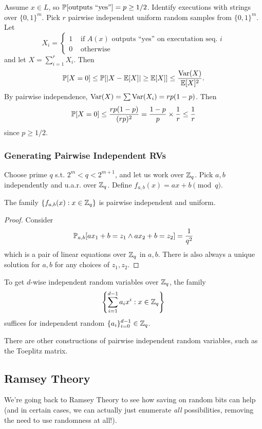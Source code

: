 \documentclass[11 pt]{scrartcl}
\begin{document}
    Assume $x\in L$, so $\mathbb P[\text{outputs ``yes''}] = p \geq 1/2$. Identify executions with strings over $\{0,1\}^m$. Pick $r$ pairwise independent uniform random samples from $\{0,1\}^m$. Let 
    \[ X_i = \begin{cases} 1 &\text{ if } A(x) \text{ outputs ``yes'' on executation seq. }i \\ 0 &\text{ otherwise} \end{cases}\] 
    and let $X = \sum_{i=1}^r X_i$. Then 
    \[ \mathbb P[X = 0] \leq \mathbb P[|X - \mathbb E[X]| \geq \mathbb E[X]] \leq \dfrac{\text{Var}(X)}{\mathbb E[X]^2}.\] 
    By pairwise independence, $\text{Var}(X) = \sum \text{Var}(X_i) = rp(1-p)$. Then 
    \[ \mathbb P[X = 0] \leq \dfrac{rp(1-p)}{(rp)^2} = \dfrac{1-p}{p}\times \dfrac{1}{r} \leq \dfrac{1}{r}\] 
    since $p \geq 1/2$. 

\subsubsection{Generating Pairwise Independent RVs}
Choose prime $q$ s.t. $2^m < q < 2^{m+1}$, and let us work over $\mathbb Z_q$. Pick $a,b$ independently and u.a.r. over $\mathbb Z_q$. Define $f_{a,b}(x) = ax+b \pmod{q}$.

\begin{claim}
    The family $\{f_{a,b}(x) : x \in \mathbb Z_q\}$ is pairwise independent and uniform.
\end{claim}
\begin{proof}
    Consider 
    \[ \mathbb P_{a,b}[ax_1 + b = z_1 \land ax_2 + b = z_2] = \dfrac{1}{q^2} \]
    which is a pair of linear equations over $\mathbb Z_q$ in $a,b$. There is also always a unique solution for $a,b$ for any choices of $z_1, z_2$. 
\end{proof}

To get $d$-wise independent random variables over $\mathbb Z_q$, the family 
\[ \left\{\sum_{i=1}^{d-1} a_i x^i : x \in \mathbb Z_q \right\} \]
suffices for independent random $\{a_i\}^{d-1}_{i=0} \in \mathbb Z_q$. 

There are other constructions of pairwise independent random variables, such as the Toeplitz matrix. 

\subsection{Ramsey Theory}
We're going back to Ramsey Theory to see how saving on random bits can help (and in certain cases, we can actually just enumerate \emph{all} possibilities, removing the need to use randomness at all!). 
\end{document}
